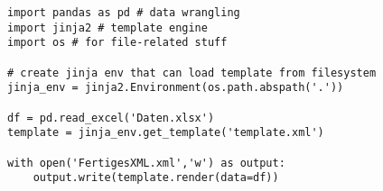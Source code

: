 \documentclass[12pt,ngerman]{scrartcl}
\begin{document}
\begin{lstlisting}[caption={Mein erstes Listing}]
import pandas as pd # data wrangling
import jinja2 # template engine
import os # for file-related stuff

# create jinja env that can load template from filesystem
jinja_env = jinja2.Environment(os.path.abspath('.'))
 
df = pd.read_excel('Daten.xlsx')
template = jinja_env.get_template('template.xml')
 
with open('FertigesXML.xml','w') as output:
    output.write(template.render(data=df))
\end{lstlisting}
\end{document}
